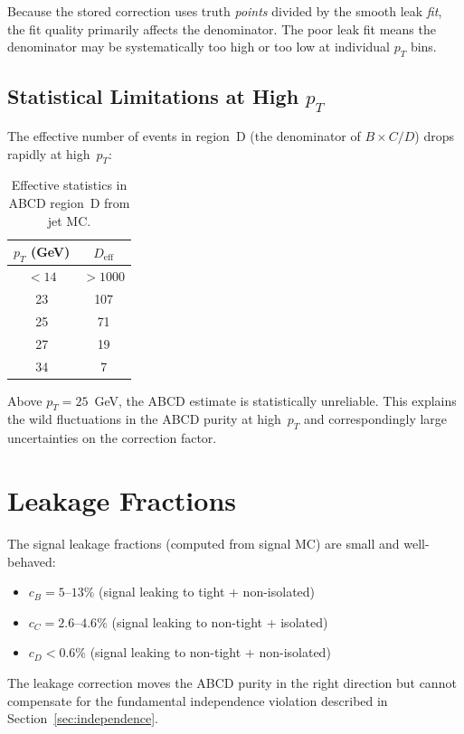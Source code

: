 \documentclass[11pt,a4paper]{article}
\begin{document}
Because the stored correction uses truth \emph{points} divided by the
smooth leak \emph{fit}, the fit quality primarily affects the denominator.
The poor leak fit means the denominator may be systematically too high
or too low at individual $p_T$ bins.

\subsection{Statistical Limitations at High $p_T$}
\label{sec:stats}

The effective number of events in region~D (the denominator of $B \times C / D$)
drops rapidly at high~$p_T$:

\begin{table}[H]
\centering
\caption{Effective statistics in ABCD region~D from jet MC.}
\label{tab:deff}
\begin{tabular}{@{}cc@{}}
\toprule
$p_T$ (GeV) & $D_{\mathrm{eff}}$ \\
\midrule
$< 14$ & $> 1000$ \\
23 & 107 \\
25 & 71 \\
27 & 19 \\
34 & 7 \\
\bottomrule
\end{tabular}
\end{table}

Above $p_T = 25$~GeV, the ABCD estimate is statistically unreliable.
This explains the wild fluctuations in the ABCD purity at high~$p_T$
and correspondingly large uncertainties on the correction factor.

\section{Leakage Fractions}
\label{sec:leakage}

The signal leakage fractions (computed from signal MC) are small
and well-behaved:
\begin{itemize}
\item $c_B = 5$--$13\%$ (signal leaking to tight + non-isolated)
\item $c_C = 2.6$--$4.6\%$ (signal leaking to non-tight + isolated)
\item $c_D < 0.6\%$ (signal leaking to non-tight + non-isolated)
\end{itemize}

The leakage correction moves the ABCD purity in the right direction
but cannot compensate for the fundamental independence violation
described in Section~\ref{sec:independence}.
\end{document}
